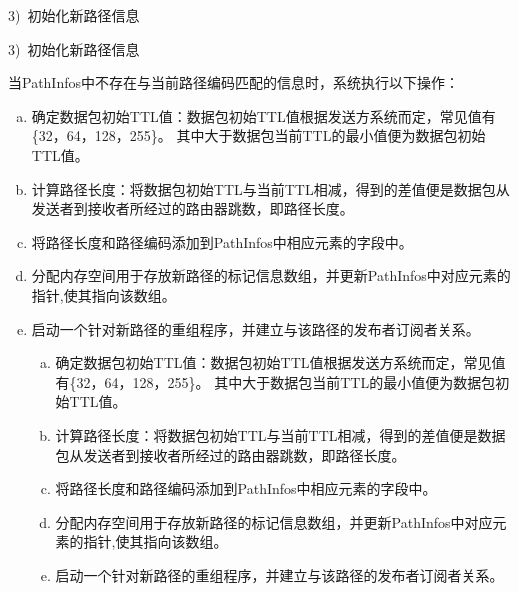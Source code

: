 3)~初始化新路径信息\par
3)~初始化新路径信息\par
当PathInfos中不存在与当前路径编码匹配的信息时，系统执行以下操作：
\begin{enumerate}[a.]
	\item 确定数据包初始TTL值：数据包初始TTL值根据发送方系统而定，常见值有\{32，64，128，255\}\cite{liu2007dynamic}。 其中大于数据包当前TTL的最小值便为数据包初始TTL值。 
	\item 计算路径长度：将数据包初始TTL与当前TTL相减，得到的差值便是数据包从发送者到接收者所经过的路由器跳数，即路径长度。
	\item 将路径长度和路径编码添加到PathInfos中相应元素的字段中。
	\item 分配内存空间用于存放新路径的标记信息数组，并更新PathInfos中对应元素的指针,使其指向该数组。
	\item 启动一个针对新路径的重组程序，并建立与该路径的发布者订阅者关系。
\begin{enumerate}[a.]
	\item 确定数据包初始TTL值：数据包初始TTL值根据发送方系统而定，常见值有\{32，64，128，255\}\cite{liu2007dynamic}。 其中大于数据包当前TTL的最小值便为数据包初始TTL值。 
	\item 计算路径长度：将数据包初始TTL与当前TTL相减，得到的差值便是数据包从发送者到接收者所经过的路由器跳数，即路径长度。
	\item 将路径长度和路径编码添加到PathInfos中相应元素的字段中。
	\item 分配内存空间用于存放新路径的标记信息数组，并更新PathInfos中对应元素的指针,使其指向该数组。
	\item 启动一个针对新路径的重组程序，并建立与该路径的发布者订阅者关系。
\end{enumerate}
\par


\end{enumerate}
